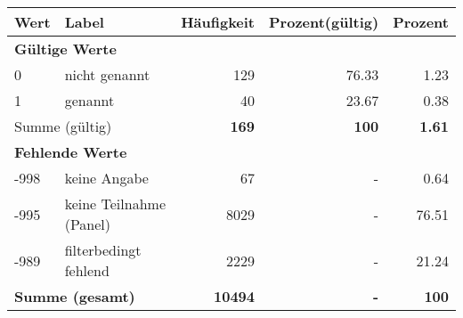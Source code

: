      \begin{longtable}{lXrrr}
     \toprule
     \textbf{Wert} & \textbf{Label} & \textbf{Häufigkeit} & \textbf{Prozent(gültig)} & \textbf{Prozent} \\
     \endhead
     \midrule
     \multicolumn{5}{l}{\textbf{Gültige Werte}}\\

     0 &
     \multicolumn{1}{X}{ nicht genannt   } &


       \num{129} &
       \num[round-mode=places,round-precision=2]{76,33} &
         \num[round-mode=places,round-precision=2]{1,23} \\

     1 &
     \multicolumn{1}{X}{ genannt   } &


       \num{40} &
       \num[round-mode=places,round-precision=2]{23,67} &
         \num[round-mode=places,round-precision=2]{0,38} \\
     \midrule
     \multicolumn{2}{l}{Summe (gültig)} &
       \textbf{\num{169}} &
     \textbf{100} &
       \textbf{\num[round-mode=places,round-precision=2]{1,61}} \\
     \multicolumn{5}{l}{\textbf{Fehlende Werte}}\\
       -998 &
       keine Angabe &
         \num{67} &
        - &
         \num[round-mode=places,round-precision=2]{0,64} \\
       -995 &
       keine Teilnahme (Panel) &
         \num{8029} &
        - &
         \num[round-mode=places,round-precision=2]{76,51} \\
       -989 &
       filterbedingt fehlend &
         \num{2229} &
        - &
         \num[round-mode=places,round-precision=2]{21,24} \\
     \midrule
     \multicolumn{2}{l}{\textbf{Summe (gesamt)}} &
          \textbf{\num{10494}} &
        \textbf{-} &
        \textbf{100} \\
     \bottomrule
     \end{longtable}
     
